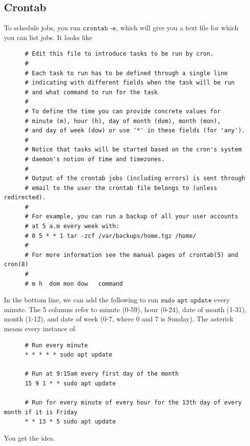 \documentclass{article}
\begin{document}
  \subsection{Crontab}

    To schedule jobs, you run $\texttt{crontab -e}$, which will give you a text file for which you can list jobs. It looks like  

    \begin{lstlisting}
      # Edit this file to introduce tasks to be run by cron.
      # 
      # Each task to run has to be defined through a single line
      # indicating with different fields when the task will be run
      # and what command to run for the task
      # 
      # To define the time you can provide concrete values for
      # minute (m), hour (h), day of month (dom), month (mon),
      # and day of week (dow) or use '*' in these fields (for 'any').
      # 
      # Notice that tasks will be started based on the cron's system
      # daemon's notion of time and timezones.
      # 
      # Output of the crontab jobs (including errors) is sent through
      # email to the user the crontab file belongs to (unless redirected).
      # 
      # For example, you can run a backup of all your user accounts
      # at 5 a.m every week with:
      # 0 5 * * 1 tar -zcf /var/backups/home.tgz /home/
      # 
      # For more information see the manual pages of crontab(5) and cron(8)
      # 
      # m h  dom mon dow   command
    \end{lstlisting}

    In the bottom line, we can add the following to run $\texttt{sudo apt update}$ every minute. The 5 columns refer to minute (0-59), hour (0-24), date of month (1-31), month (1-12), and date of week (0-7, where 0 and 7 is Sunday). The asterick means every instance of. 

    \begin{lstlisting}
      # Run every minute
      * * * * * sudo apt update 

      # Run at 9:15am every first day of the month 
      15 9 1 * * sudo apt update

      # Run for every minute of every hour for the 13th day of every month if it is Friday
      * * 13 * 5 sudo apt update
    \end{lstlisting}
    You get the idea. 
\end{document}
